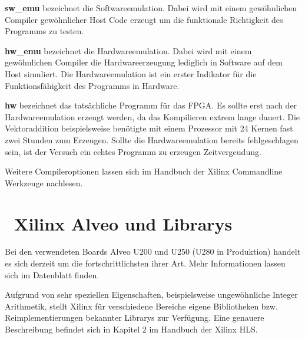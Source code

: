 		\textbf{sw{\_}emu} bezeichnet die Softwareemulation. Dabei wird mit einem gewöhnlichen Compiler gewöhnlicher Host Code erzeugt um die funktionale Richtigkeit des Programms zu testen.
		
		\textbf{hw{\_}emu} bezeichnet die Hardwareemulation. Dabei wird mit einem gewöhnlichen Compiler die Hardwareerzeugung lediglich in Software auf dem Host simuliert. Die Hardwareemulation ist ein erster Indikator für die Funktionsfähigkeit des Programms in Hardware.
		
		\textbf{hw} bezeichnet das tatsächliche Programm für das FPGA. Es sollte erst nach der Hardwareemulation erzeugt werden, da das Kompilieren extrem lange dauert. Die Vektoraddition beispielsweise benötigte mit einem Prozessor mit 24 Kernen fast zwei Stunden zum Erzeugen. Sollte die Hardwareemulation bereits fehlgeschlagen sein, ist der Versuch ein echtes Programm zu erzeugen Zeitvergeudung.
		
		Weitere Compileroptionen lassen sich im Handbuch der Xilinx Commandline Werkzeuge nachlesen. \autocite{xocc}


		\section{~Xilinx Alveo und Librarys}
		Bei den verwendeten Boards Alveo U200 und U250 (U280 in Produktion) handelt es sich derzeit um die fortschrittlichsten ihrer Art. Mehr Informationen lassen sich im Datenblatt finden. \autocite{alveo}
		
		Aufgrund von sehr speziellen Eigenschaften, beispielsweise ungewöhnliche Integer Arithmetik, stellt Xilinx für verschiedene Bereiche eigene Bibliotheken bzw. Reimplementierungen bekannter Librarys zur Verfügung. Eine genauere Beschreibung befindet sich in Kapitel 2 im Handbuch der Xilinx HLS. \autocite{hls}
		
